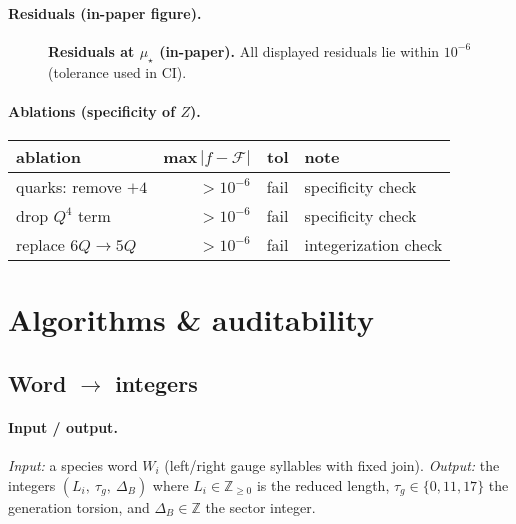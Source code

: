 \documentclass[epjc3]{svjour3}
\begin{document}
\paragraph{Residuals (in-paper figure).}
\begin{figure}[h]
  \centering
  \caption{\textbf{Residuals at $\mu_\star$ (in-paper).} All displayed residuals lie within $10^{-6}$ (tolerance used in CI).}
\end{figure}

\paragraph{Ablations (specificity of $Z$).}
\begin{center}
\begin{tabular}{lrrl} \toprule
ablation & max$\,|f-\mathcal F|$ & tol & note \\ \midrule
quarks: remove $+4$ & $>10^{-6}$ & fail & specificity check \\
drop $Q^4$ term & $>10^{-6}$ & fail & specificity check \\
replace $6Q\to5Q$ & $>10^{-6}$ & fail & integerization check \\
\bottomrule
\end{tabular}
\end{center}

\section{Algorithms \& auditability}

\subsection{Word $\to$ integers}
\paragraph{Input / output.}
\emph{Input:} a species word $W_i$ (left/right gauge syllables with fixed join). 
\emph{Output:} the integers $(L_i,\ \tau_g,\ \Delta_B)$ where $L_i\in\mathbb{Z}_{\ge0}$ is the reduced length, $\tau_g\in\{0,11,17\}$ the generation torsion, and $\Delta_B\in\mathbb{Z}$ the sector integer.
\end{document}
